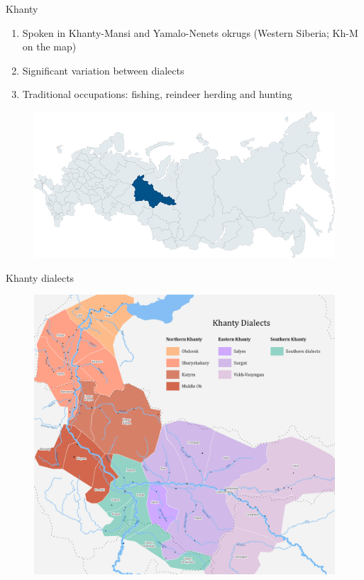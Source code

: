 \documentclass[10 pt, handout]{beamer}
\begin{document}
\begin{frame}{Khanty}

	\begin{enumerate}[$\gg$]
		\item Spoken in Khanty-Mansi and Yamalo-Nenets okrugs (Western Siberia; Kh-M on the map)
		\item Significant variation between dialects
		\item Traditional occupations: fishing, reindeer herding and hunting
	\end{enumerate}
	
	\begin{figure}[H]
		\centering
		\includegraphics[scale=.3]{khmao-map}
	\end{figure}
	
\end{frame}

\begin{frame}{Khanty dialects}
	
	\begin{figure}[H]
		\centering
		\includegraphics[scale=.12]{khanty-dialects}
	\end{figure}

\end{frame}
\end{document}
